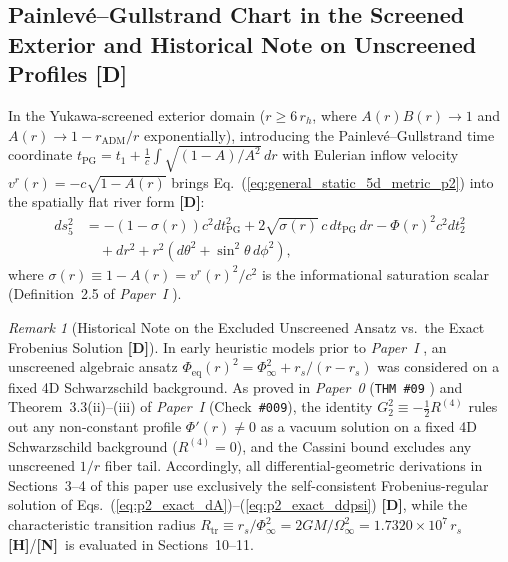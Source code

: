 \documentclass[11pt,a4paper]{article}
\newcommand{\catD}{\textbf{\textcolor{blue!75!black}{[D]}}}
\newcommand{\catH}{\textbf{\textcolor{orange!85!black}{[H]}}}
\newcommand{\catN}{\textbf{\textcolor{teal!75!black}{[N]}}}
\theoremstyle{plain}
\theoremstyle{definition}
\theoremstyle{remark}
\newtheorem{remark}[theorem]{Remark}
\numberwithin{equation}{section}
\begin{document}
\subsection{\texorpdfstring{Painlev\'e--Gullstrand Chart in the Screened Exterior and Historical Note on Unscreened Profiles \catD}{Painleve-Gullstrand Chart in the Screened Exterior and Historical Note on Unscreened Profiles}}

In the Yukawa-screened exterior domain ($r \ge 6\,r_h$, where $A(r)B(r) \to 1$ and $A(r) \to 1 - r_{\text{ADM}}/r$ exponentially), introducing the Painlev\'e--Gullstrand time coordinate $t_{\text{PG}} = t_1 + \frac{1}{c}\int\sqrt{(1 - A)/A^2}\,dr$ with Eulerian inflow velocity $v^r(r) = -c\sqrt{1 - A(r)}$ brings Eq.~(\ref{eq:general_static_5d_metric_p2}) into the spatially flat river form \cite{painleve1921,gullstrand1922,hamilton2008,schutz1970} \catD:
\begin{align}
  ds_5^2 &= -\left(1 - \sigma(r)\right)c^2 dt_{\text{PG}}^2 + 2\sqrt{\sigma(r)}\,c\,dt_{\text{PG}}\,dr - \Phi(r)^2 c^2 dt_2^2 \nonumber \\[3pt]
  &\quad + dr^2 + r^2\left(d\theta^2 + \sin^2\theta\,d\phi^2\right),
  \label{eq:pg_river_metric_p2}
\end{align}
where $\sigma(r) \equiv 1 - A(r) = v^r(r)^2/c^2$ is the informational saturation scalar (Definition~2.5 of \textit{Paper~I} \cite{jimenez2026a}).

\begin{remark}[Historical Note on the Excluded Unscreened Ansatz vs.\ the Exact Frobenius Solution \catD]
\label{rem:two_branches_distinction}
In early heuristic models prior to \textit{Paper~I} \cite{jimenez2026a}, an unscreened algebraic ansatz $\Phi_{\text{eq}}(r)^2 = \Phi_{\infty}^2 + r_s/(r - r_s)$ was considered on a fixed 4D Schwarzschild background. As proved in \textit{Paper~0} (\texttt{THM~\#09} \cite{jimenez2026_p0}) and Theorem~3.3(ii)--(iii) of \textit{Paper~I} \cite{jimenez2026a} (Check~\texttt{\#009}), the identity $G^2_2 \equiv -\frac{1}{2}R^{(4)}$ rules out any non-constant profile $\Phi'(r) \neq 0$ as a vacuum solution on a fixed 4D Schwarzschild background ($R^{(4)} = 0$), and the Cassini bound excludes any unscreened $1/r$ fiber tail. Accordingly, all differential-geometric derivations in Sections~3--4 of this paper use exclusively the self-consistent Frobenius-regular solution of Eqs.~(\ref{eq:p2_exact_dA})--(\ref{eq:p2_exact_ddpsi}) \catD, while the characteristic transition radius $R_{\text{tr}} \equiv r_s/\Phi_{\infty}^2 = 2GM/\Omega_{\infty}^2 = 1.7320 \times 10^7\,r_s$ \catH/\catN\ is evaluated in Sections~10--11.
\end{remark}
\end{document}
